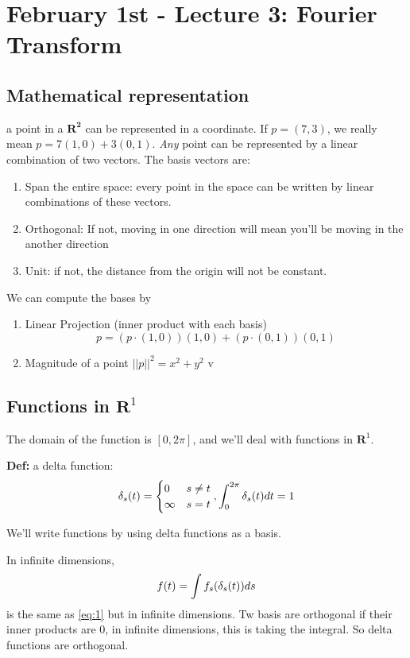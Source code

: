 \pagebreak
\section{February 1st - Lecture 3: Fourier Transform}
\label{sec:lec3}

\subsection{Mathematical representation}

\label{sec:math-repr}
a point in a $\mathbf{R^2}$ can be represented in a
coordinate. If $p=(7,3)$, we really mean $p = 7(1,0) +
3(0,1)$. \emph{Any} point can be represented by a linear combination
of two vectors. The basis vectors are:
\begin{enumerate}
\item Span the entire space: every point in the space can be written by  linear combinations of these vectors.
\item Orthogonal: If not, moving in one direction will mean you'll be
  moving in the another direction 
\item Unit: if not, the distance from the origin will not be constant.
\end{enumerate}

We can compute the bases by
\begin{enumerate}
\item Linear Projection (inner product with each basis) 
  \begin{equation}
p = (p\cdot
  (1,0))(1,0) + (p\cdot (0,1))(0,1)\label{eq:1}  
\end{equation}
\item Magnitude of a point $||p||^2 = x^2 + y^2$
v\end{enumerate}

\subsection{Functions in $\mathbf{R}^1$}
The domain of the function is $[0,2\pi]$, and we'll deal with
functions in $\mathbf{R}^1$.

\textbf{Def:} a delta function: $$\delta_s(t) =
\begin{cases}
  0 & s\neq t\\
\infty & s=t
\end{cases}, \int_0^{2\pi}\delta_s(t) dt = 1$$

We'll write functions by using delta functions as a basis.

In infinite dimensions, 
$$f(t) = \int f_s(\delta_s(t))ds$$ is the same as \eqref{eq:1} but in
infinite dimensions. 
Tw basis are orthogonal if their inner products are 0, in infinite
dimensions, this is taking the integral. So delta functions are orthogonal.


